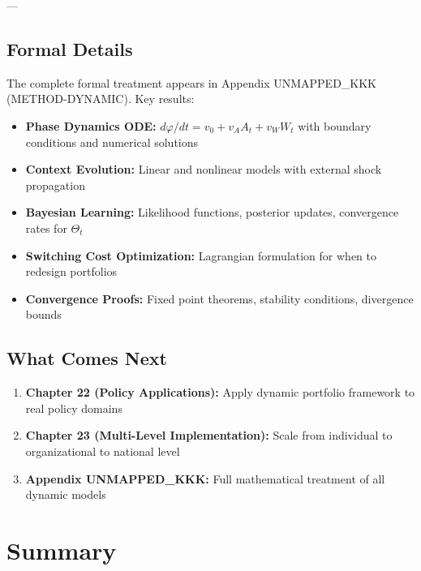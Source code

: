 ---

\subsection{Formal Details}
\label{sec:ch21-formal}

The complete formal treatment appears in Appendix UNMAPPED_KKK (METHOD-DYNAMIC). Key results:

\begin{itemize}[nosep]
    \item \textbf{Phase Dynamics ODE:} $d\varphi/dt = v_0 + v_A A_t + v_W W_t$ with boundary conditions and numerical solutions
    \item \textbf{Context Evolution:} Linear and nonlinear models with external shock propagation
    \item \textbf{Bayesian Learning:} Likelihood functions, posterior updates, convergence rates for $\Theta_t$
    \item \textbf{Switching Cost Optimization:} Lagrangian formulation for when to redesign portfolios
    \item \textbf{Convergence Proofs:} Fixed point theorems, stability conditions, divergence bounds
\end{itemize}

\subsection{What Comes Next}
\label{sec:ch21-what-comes-next}

\begin{enumerate}
    \item \textbf{Chapter 22 (Policy Applications):} Apply dynamic portfolio framework to real policy domains
    \item \textbf{Chapter 23 (Multi-Level Implementation):} Scale from individual to organizational to national level
    \item \textbf{Appendix UNMAPPED_KKK:} Full mathematical treatment of all dynamic models
\end{enumerate}


\section{Summary}
\label{sec:ch21-summary}

